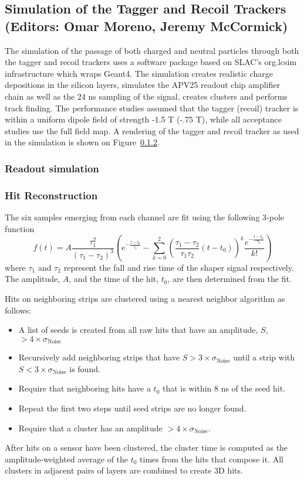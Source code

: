 
\subsection{Simulation of the Tagger and Recoil Trackers (Editors: Omar Moreno, Jeremy McCormick)}

The simulation of the passage of both charged and neutral particles through 
both the tagger and recoil trackers uses a software package based on SLAC's 
org.lcsim infrastructure which wraps Geant4.  The simulation creates realistic
charge depositions in the silicon layers, simulates the APV25 readout chip 
amplifier chain as well as the 24 ns sampling of the signal, creates clusters 
and performs track finding.  The performance studies assumed that the 
tagger (recoil) tracker is within a uniform dipole field of strength -1.5 T 
(-.75 T), while all acceptance studies use the full field map.  A rendering of
the tagger and recoil tracker as used in the simulation is shown on Figure~\ref{}.

\subsubsection{Readout simulation}


\subsubsection{Hit Reconstruction}

The six samples emerging from each channel are fit using the following 3-pole 
function
\begin{equation}
    f(t) = A\frac{\tau_1^2}{(\tau_1 - \tau_2)^3}\left( e^{-\frac{t-t_{0}}{\tau_1}}
        - \sum_{k=0}^2 \left(\frac{\tau_1 - \tau_2}{\tau_1\tau_2}(t-t_{0})\right)^k
        \frac{e^{-\frac{t-t_{0}}{\tau_2}}}{k!} \right)
\end{equation}
where $\tau_1$ and $\tau_2$ represent the fall and rise time of the shaper 
signal respectively.  The amplitude, $A$, and the time of the hit, $t_0$, are then
determined from the fit.

Hits on neighboring strips are clustered using a nearest neighbor
algorithm as follows: 
\begin{itemize}
    \item A list of seeds is created from all raw hits that have an amplitude, $S$,
          $> 4\times \sigma_{\text{Noise}}$
  \item Recursively add neighboring strips that have $S> 3 \times \sigma_{\text{Noise}}$
          until a strip with $S < 3\times \sigma_{\text{Noise}}$ is found.
      \item Require that neighboring hits have a $t_{0}$ that is within 8 ns of the seed hit.
    \item Repeat the first two steps until seed strips are no longer found.
\item Require that a cluster has an amplitude $> 4 \times \sigma_{\text{Noise}}$.
\end{itemize}
After hits on a sensor have been
clustered, the cluster time is computed as the amplitude-weighted average
of the $t_0$ times from the hits that compose it. All clusters in adjacent pairs
of layers are combined to create 3D hits.

